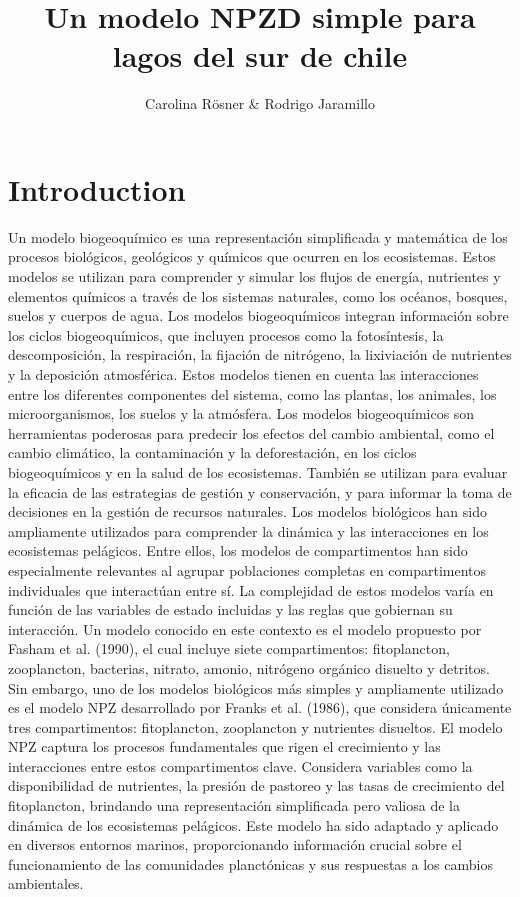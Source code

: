 \documentclass{article}
\title{Un modelo NPZD simple para lagos del sur de chile}
\author{Carolina Rösner & Rodrigo Jaramillo}
\begin{document}
\maketitle
\section{Introduction}

Un modelo biogeoquímico es una representación simplificada y matemática de los procesos biológicos, geológicos y químicos que ocurren en los ecosistemas. Estos modelos se utilizan para comprender y simular los flujos de energía, nutrientes y elementos químicos a través de los sistemas naturales, como los océanos, bosques, suelos y cuerpos de agua.
Los modelos biogeoquímicos integran información sobre los ciclos biogeoquímicos, que incluyen procesos como la fotosíntesis, la descomposición, la respiración, la fijación de nitrógeno, la lixiviación de nutrientes y la deposición atmosférica. Estos modelos tienen en cuenta las interacciones entre los diferentes componentes del sistema, como las plantas, los animales, los microorganismos, los suelos y la atmósfera.
Los modelos biogeoquímicos son herramientas poderosas para predecir los efectos del cambio ambiental, como el cambio climático, la contaminación y la deforestación, en los ciclos biogeoquímicos y en la salud de los ecosistemas. También se utilizan para evaluar la eficacia de las estrategias de gestión y conservación, y para informar la toma de decisiones en la gestión de recursos naturales.
Los modelos biológicos han sido ampliamente utilizados para comprender la dinámica y las interacciones en los ecosistemas pelágicos. Entre ellos, los modelos de compartimentos han sido especialmente relevantes al agrupar poblaciones completas en compartimentos individuales que interactúan entre sí. La complejidad de estos modelos varía en función de las variables de estado incluidas y las reglas que gobiernan su interacción.
Un modelo conocido en este contexto es el modelo propuesto por Fasham et al. (1990), el cual incluye siete compartimentos: fitoplancton, zooplancton, bacterias, nitrato, amonio, nitrógeno orgánico disuelto y detritos. Sin embargo, uno de los modelos biológicos más simples y ampliamente utilizado es el modelo NPZ desarrollado por Franks et al. (1986), que considera únicamente tres compartimentos: fitoplancton, zooplancton y nutrientes disueltos.
El modelo NPZ captura los procesos fundamentales que rigen el crecimiento y las interacciones entre estos compartimentos clave. Considera variables como la disponibilidad de nutrientes, la presión de pastoreo y las tasas de crecimiento del fitoplancton, brindando una representación simplificada pero valiosa de la dinámica de los ecosistemas pelágicos. Este modelo ha sido adaptado y aplicado en diversos entornos marinos, proporcionando información crucial sobre el funcionamiento de las comunidades planctónicas y sus respuestas a los cambios ambientales.
\end{document}

